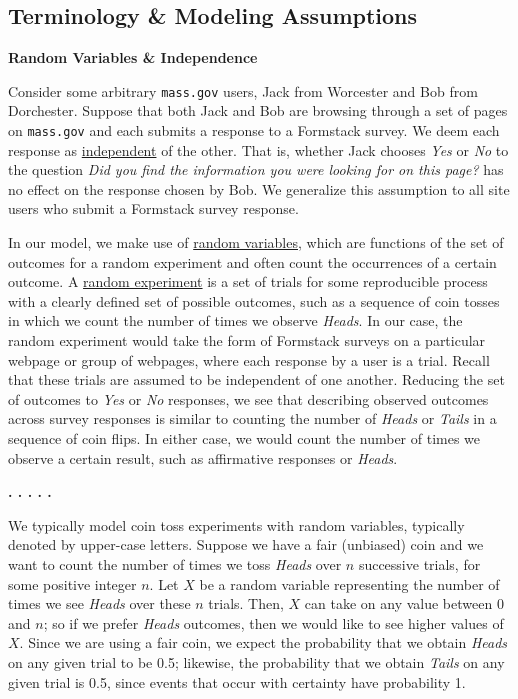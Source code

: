\subsection*{Terminology \& Modeling Assumptions}

\textbf{Random Variables \& Independence}

Consider some arbitrary \texttt{mass.gov} users, Jack from Worcester and Bob from Dorchester. Suppose that both Jack and Bob are browsing through a set of pages on \texttt{mass.gov} and each submits a response to a Formstack survey. We deem each response as \href{https://en.wikipedia.org/wiki/Independence_(probability_theory)}{independent} of the other. That is, whether Jack chooses \textit{Yes} or \textit{No} to the question \textit{Did you find the information you were looking for on this page?} has no effect on the response chosen by Bob. We generalize this assumption to all site users who submit a Formstack survey response.

In our model, we make use of \href{https://en.wikipedia.org/wiki/Random_variable}{random variables}, which are functions of the set of outcomes for a random experiment and often count the occurrences of a certain outcome. A \href{https://en.wikipedia.org/wiki/Experiment_(probability_theory)}{random experiment} is a set of trials for some reproducible process with a clearly defined set of possible outcomes, such as a sequence of coin tosses in which we count the number of times we observe \textit{Heads}. In our case, the random experiment would take the form of Formstack surveys on a particular webpage or group of webpages, where each response by a user is a trial. Recall that these trials are assumed to be independent of one another. Reducing the set of outcomes to \textit{Yes} or \textit{No} responses, we see that describing observed outcomes across survey responses is similar to counting the number of \textit{Heads} or \textit{Tails} in a sequence of coin flips. In either case, we would count the number of times we observe a certain result, such as affirmative responses or \textit{Heads}.

\textbf{. . . . .}

We typically model coin toss experiments with random variables, typically denoted by upper-case letters. Suppose we have a fair (unbiased) coin and we want to count the number of times we toss \textit{Heads} over $n$ successive trials, for some positive integer $n$. Let $X$ be a random variable representing the number of times we see \textit{Heads} over these $n$ trials. Then, $X$ can take on any value between 0 and $n$; so if we prefer \textit{Heads} outcomes, then we would like to see higher values of $X$. Since we are using a fair coin, we expect the probability that we obtain \textit{Heads} on any given trial to be 0.5; likewise, the probability that we obtain \textit{Tails} on any given trial is 0.5, since events that occur with certainty have probability 1.

